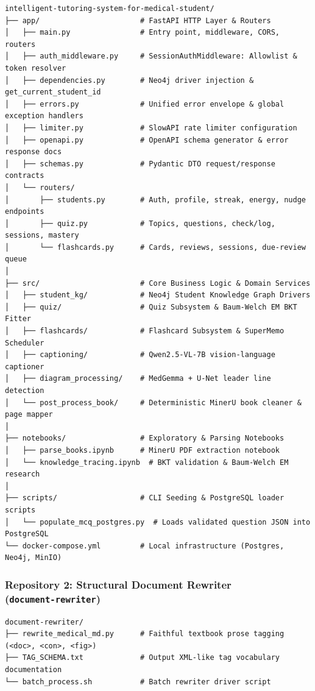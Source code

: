 {\small
\begin{verbatim}
intelligent-tutoring-system-for-medical-student/
├── app/                       # FastAPI HTTP Layer & Routers
│   ├── main.py                # Entry point, middleware, CORS, routers
│   ├── auth_middleware.py     # SessionAuthMiddleware: Allowlist & token resolver
│   ├── dependencies.py        # Neo4j driver injection & get_current_student_id
│   ├── errors.py              # Unified error envelope & global exception handlers
│   ├── limiter.py             # SlowAPI rate limiter configuration
│   ├── openapi.py             # OpenAPI schema generator & error response docs
│   ├── schemas.py             # Pydantic DTO request/response contracts
│   └── routers/
│       ├── students.py        # Auth, profile, streak, energy, nudge endpoints
│       ├── quiz.py            # Topics, questions, check/log, sessions, mastery
│       └── flashcards.py      # Cards, reviews, sessions, due-review queue
│
├── src/                       # Core Business Logic & Domain Services
│   ├── student_kg/            # Neo4j Student Knowledge Graph Drivers
│   ├── quiz/                  # Quiz Subsystem & Baum-Welch EM BKT Fitter
│   ├── flashcards/            # Flashcard Subsystem & SuperMemo Scheduler
│   ├── captioning/            # Qwen2.5-VL-7B vision-language captioner
│   ├── diagram_processing/    # MedGemma + U-Net leader line detection
│   └── post_process_book/     # Deterministic MinerU book cleaner & page mapper
│
├── notebooks/                 # Exploratory & Parsing Notebooks
│   ├── parse_books.ipynb      # MinerU PDF extraction notebook
│   └── knowledge_tracing.ipynb  # BKT validation & Baum-Welch EM research
│
├── scripts/                   # CLI Seeding & PostgreSQL loader scripts
│   └── populate_mcq_postgres.py  # Loads validated question JSON into PostgreSQL
└── docker-compose.yml         # Local infrastructure (Postgres, Neo4j, MinIO)
\end{verbatim}
}

\subsubsection*{Repository 2: Structural Document Rewriter\\{\normalsize\normalfont(\texttt{document-rewriter})}}

{\small
\begin{verbatim}
document-rewriter/
├── rewrite_medical_md.py      # Faithful textbook prose tagging (<doc>, <con>, <fig>)
├── TAG_SCHEMA.txt             # Output XML-like tag vocabulary documentation
└── batch_process.sh           # Batch rewriter driver script
\end{verbatim}
}


